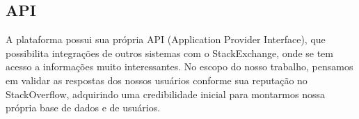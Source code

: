 \subsection{API}%
A plataforma possui sua própria API (Application Provider Interface), que possibilita integrações de outros sistemas com o StackExchange, onde se tem acesso a informações muito interessantes. No escopo do nosso trabalho, pensamos em validar as respostas dos nossos usuários conforme sua reputação no StackOverflow, adquirindo uma credibilidade inicial para montarmos nossa própria base de dados e de usuários.